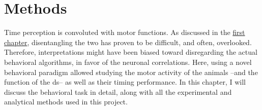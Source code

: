 \chapter{Methods} 
\label{ch:methods:methods}
Time perception is convoluted with motor functions.
As discussed in the \hyperref[ch:intro:intro]{first chapter}, disentangling the two has proven to be difficult, and often, overlooked.
Therefore, interpretations might have been biased toward disregarding the actual behavioral algorithms, in favor of the neuronal correlations.
Here, using a novel behavioral paradigm allowed studying the motor activity of the animals --and the function of the \gls{ds}-- as well as their timing performance.
In this chapter, I will discuss the behavioral task in detail, along with all the experimental and analytical methods used in this project.



